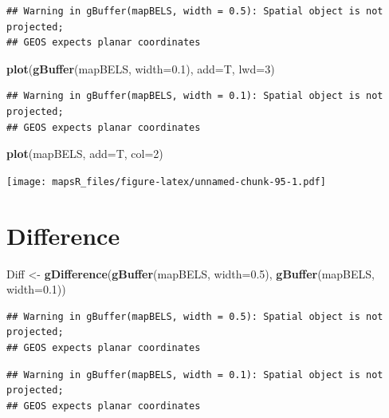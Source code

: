 \documentclass[]{report}
\newenvironment{Shaded}{\begin{snugshade}}{\end{snugshade}}
\newcommand{\DataTypeTok}[1]{\textcolor[rgb]{0.13,0.29,0.53}{#1}}
\newcommand{\DecValTok}[1]{\textcolor[rgb]{0.00,0.00,0.81}{#1}}
\newcommand{\FloatTok}[1]{\textcolor[rgb]{0.00,0.00,0.81}{#1}}
\newcommand{\KeywordTok}[1]{\textcolor[rgb]{0.13,0.29,0.53}{\textbf{#1}}}
\newcommand{\NormalTok}[1]{#1}
\newcommand{\StringTok}[1]{\textcolor[rgb]{0.31,0.60,0.02}{#1}}
\begin{document}
\begin{verbatim}
## Warning in gBuffer(mapBELS, width = 0.5): Spatial object is not projected;
## GEOS expects planar coordinates
\end{verbatim}

\begin{Shaded}
\begin{Highlighting}[]
\KeywordTok{plot}\NormalTok{(}\KeywordTok{gBuffer}\NormalTok{(mapBELS, }\DataTypeTok{width=}\FloatTok{0.1}\NormalTok{), }\DataTypeTok{add=}\NormalTok{T, }\DataTypeTok{lwd=}\DecValTok{3}\NormalTok{)}
\end{Highlighting}
\end{Shaded}

\begin{verbatim}
## Warning in gBuffer(mapBELS, width = 0.1): Spatial object is not projected;
## GEOS expects planar coordinates
\end{verbatim}

\begin{Shaded}
\begin{Highlighting}[]
\KeywordTok{plot}\NormalTok{(mapBELS, }\DataTypeTok{add=}\NormalTok{T, }\DataTypeTok{col=}\DecValTok{2}\NormalTok{)}
\end{Highlighting}
\end{Shaded}

\texttt{[image: mapsR\_files/figure-latex/unnamed-chunk-95-1.pdf]}

\hypertarget{difference}{%
\section{Difference}\label{difference}}

\begin{Shaded}
\begin{Highlighting}[]
\NormalTok{Diff <-}\StringTok{ }\KeywordTok{gDifference}\NormalTok{(}\KeywordTok{gBuffer}\NormalTok{(mapBELS, }\DataTypeTok{width=}\FloatTok{0.5}\NormalTok{), }\KeywordTok{gBuffer}\NormalTok{(mapBELS, }\DataTypeTok{width=}\FloatTok{0.1}\NormalTok{))}
\end{Highlighting}
\end{Shaded}

\begin{verbatim}
## Warning in gBuffer(mapBELS, width = 0.5): Spatial object is not projected;
## GEOS expects planar coordinates
\end{verbatim}

\begin{verbatim}
## Warning in gBuffer(mapBELS, width = 0.1): Spatial object is not projected;
## GEOS expects planar coordinates
\end{verbatim}
\end{document}
